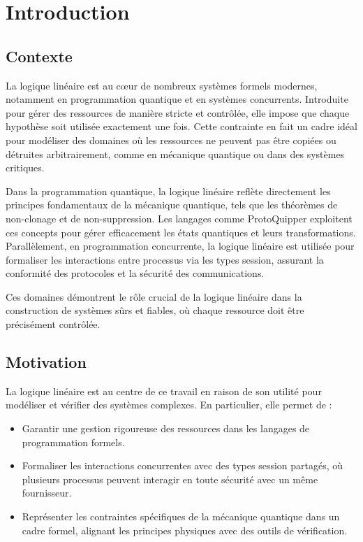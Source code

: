 %
\chapter{Introduction}
\label{ch::chapitre1}

\section{Contexte}

La logique linéaire est au cœur de nombreux systèmes formels modernes, notamment en programmation quantique et en systèmes concurrents. Introduite pour gérer des ressources de manière stricte et contrôlée, elle impose que chaque hypothèse soit utilisée exactement une fois. Cette contrainte en fait un cadre idéal pour modéliser des domaines où les ressources ne peuvent pas être copiées ou détruites arbitrairement, comme en mécanique quantique ou dans des systèmes critiques.

Dans la programmation quantique, la logique linéaire reflète directement les principes fondamentaux de la mécanique quantique, tels que les théorèmes de non-clonage et de non-suppression. Les langages comme ProtoQuipper exploitent ces concepts pour gérer efficacement les états quantiques et leurs transformations. Parallèlement, en programmation concurrente, la logique linéaire est utilisée pour formaliser les interactions entre processus via les types session, assurant la conformité des protocoles et la sécurité des communications.

Ces domaines démontrent le rôle crucial de la logique linéaire dans la construction de systèmes sûrs et fiables, où chaque ressource doit être précisément contrôlée.

\section{Motivation}

La logique linéaire est au centre de ce travail en raison de son utilité pour modéliser et vérifier des systèmes complexes. En particulier, elle permet de :

\begin{itemize}
    \item Garantir une gestion rigoureuse des ressources dans les langages de programmation formels.
    \item Formaliser les interactions concurrentes avec des types session partagés, où plusieurs processus peuvent interagir en toute sécurité avec un même fournisseur.
    \item Représenter les contraintes spécifiques de la mécanique quantique dans un cadre formel, alignant les principes physiques avec des outils de vérification.
\end{itemize}


